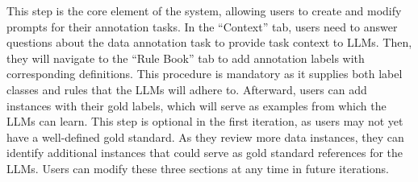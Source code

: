 

This step is the core element of the system, allowing users to create and modify prompts for their annotation tasks. In the ``Context'' tab, users need to answer questions about the data annotation task to provide task context to LLMs. Then, they will navigate to the ``Rule Book'' tab to add annotation labels with corresponding definitions. This procedure is mandatory as it supplies both label classes and rules that the LLMs will adhere to. Afterward, users can add instances with their gold labels, which will serve as examples from which the LLMs can learn. 
This step is optional in the first iteration, as users may not yet have a well-defined gold standard. As they review more data instances, they can identify additional instances that could serve as gold standard references for the LLMs.
Users can modify these three sections at any time in future iterations.
